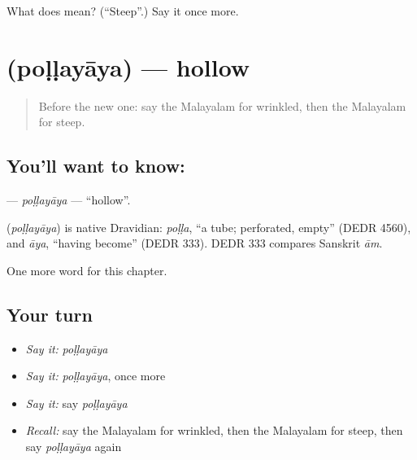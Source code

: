 \begin{tcolorbox}[breakable,colback=teal!4,colframe=teal!35!black,title={Before you move on}]
What does  mean? (\textquotedblleft{}Steep\textquotedblright{}.) Say it once more.
\end{tcolorbox}
\section[\texorpdfstring{\ml{പൊള്ളയായ} (poḷḷayāya)}{പൊള്ളയായ (poḷḷayāya)}]{ (poḷḷayāya) — hollow}

\label{lesson:ML-C285-pollayaya}



\begin{quote}
Before the new one: say the Malayalam for wrinkled, then the Malayalam for steep.
\end{quote}

\subsection*{You'll want to know: }
\textbf{} — \emph{poḷḷayāya} — \textquotedblleft{}hollow\textquotedblright{}.

\begin{cousinweb}
\textbf{} (\emph{poḷḷayāya}) is native Dravidian: \emph{poḷḷa}, \textquotedblleft{}a tube; perforated, empty\textquotedblright{} (DEDR 4560), and \emph{āya}, \textquotedblleft{}having become\textquotedblright{} (DEDR 333). DEDR 333 compares Sanskrit \emph{ām}.
\end{cousinweb}

\begin{grammarlens}[title={What you've built}]
One more word for this chapter.
\end{grammarlens}

\subsection*{Your turn}
\begin{itemize}
\raggedright
  \item \emph{Say it:} \emph{poḷḷayāya}
  \item \emph{Say it:} \emph{poḷḷayāya}, once more
  \item \emph{Say it:} say \emph{poḷḷayāya}
  \item \emph{Recall:} say the Malayalam for wrinkled, then the Malayalam for steep, then say \emph{poḷḷayāya} again
\end{itemize}

